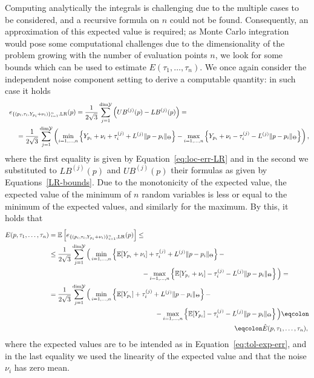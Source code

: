 Computing analytically the integrals is challenging due to the multiple cases to be considered, and a recursive formula on $n$ could not be found. 
Consequently, an approximation of this expected value is required; as Monte Carlo integration would pose some computational challenges due to the dimensionality of the problem growing with the number of evaluation points $n$, we look for some bounds which can be used to estimate $E(\tau_1,\dots, \tau_n)$.\newline
We once again consider the independent noise component setting to derive a computable quantity: in such case it holds
\begin{gather*}
    e_{\{(p_i,\tau_{i}, Y_{p_i} + \nu_i )\}_{i=1}^n, \text{LR}}(p)  = 
    \frac{1}{2\sqrt{3}} \sum_{j=1}^{\text{dim}\mathcal Y} \left( UB^{(j)}(p) - LB^{(j)}(p) \right) = \qquad \qquad \qquad \qquad \qquad\qquad \qquad\qquad \qquad  \\
    \qquad = \frac{1}{2\sqrt{3}} \sum_{j=1}^{\text{dim}\mathcal Y} 
    \left( \min_{i=1,\dots,n}\left\{ Y_{p_i} + \nu_i + \tau_{i}^{(j)} + L^{(j)} \| p - p_i \|_\Theta \right\}- \max_{i=1,\dots,n} \left\{ Y_{p_i} + \nu_i - \tau_i^{(j)} - L^{(j)} \| p - p_i \|_\Theta \right\} \right),
\end{gather*} 
where the first equality is given by Equation~\eqref{eq:loc-err-LR} and in the second we substituted to $LB^{(j)}(p)$ and $UB^{(j)}(p)$ their formulas as given by Equations~\eqref{LR-bounds}.\newline
Due to the monotonicity of the expected value, the expected value of the minimum of $n$ random variables is less or equal to the minimum of the expected values, and similarly for the maximum. 
By this, it holds that 
\begin{align*}
    E(p, \tau_1, \dots, \tau_n) &=\bb E\left[ 
        e_{\{(p_i,\tau_{i}, Y_{p_i} + \nu_i )\}_{i=1}^n, \text{LR}}(p)
   \right] \leq\\
   &\leq \frac{1}{2\sqrt{3}} \sum_{j=1}^{\text{dim}\mc Y} 
    \Big( \min_{i=1,\dots,n}\left\{ \bb E[Y_{p_i} + \nu_i] + \tau_i^{(j)} + L^{(j)} \| p - p_i \|_\Theta \right\}- \\
    & \qquad\qquad \qquad\qquad\qquad \qquad \qquad -\max_{i=1,\dots,n} \left\{ \bb E[Y_{p_i} + \nu_i] - \tau_i^{(j)} - L^{(j)} \| p - p_i \|_\Theta \right\} \Big) = \\
    &= \frac{1}{2\sqrt{3}} \sum_{j=1}^{\text{dim}\mc Y} \Big(  \min_{i=1,\dots, n}\left\{ \bb E[Y_{p_i}] + \tau_i^{(j)} + L^{(j)} \| p - p_i \|_\Theta \right\}- \\
    & \qquad\qquad\qquad \qquad\qquad\qquad \qquad \qquad - \max_{i=1,\dots,n} \left\{ \bb E[Y_{p_i} ] - \tau_i^{(j)} - L^{(j)} \| p - p_i \|_\Theta \right\} \Big)\eqcolon \\ 
    & \qquad\qquad \qquad\qquad\qquad \qquad \qquad  \qquad\qquad \qquad\qquad\qquad \qquad \qquad 
     \eqcolon\hat E(p, \tau_1, \dots, \tau_n),
\end{align*}
where the expected values are to be intended as in Equation~\eqref{eq:tol-exp-err}, and in the last equality we used the linearity of the expected value and that the noise $\nu_i$ has zero mean. \medbreak

